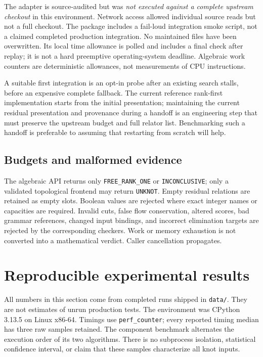 \documentclass[11pt,letterpaper]{article}
\theoremstyle{definition}\newtheorem{definition}[theorem]{Definition}
\begin{document}
The adapter is source-audited but was \emph{not executed against a complete upstream checkout} in this environment. Network access allowed individual source reads but not a full checkout. The package includes a fail-loud integration smoke script, not a claimed completed production integration. No maintained files have been overwritten. Its local time allowance is polled and includes a final check after replay; it is not a hard preemptive operating-system deadline. Algebraic work counters are deterministic allowances, not measurements of CPU instructions.

A suitable first integration is an opt-in probe after an existing search stalls, before an expensive complete fallback. The current reference rank-first implementation starts from the initial presentation; maintaining the current residual presentation and provenance during a handoff is an engineering step that must preserve the upstream budget and full relator list. Benchmarking such a handoff is preferable to assuming that restarting from scratch will help.

\subsection{Budgets and malformed evidence}
The algebraic API returns only \texttt{FREE\_RANK\_ONE} or \texttt{INCONCLUSIVE}; only a validated topological frontend may return \texttt{UNKNOT}. Empty residual relations are retained as empty slots. Boolean values are rejected where exact integer names or capacities are required. Invalid cuts, false flow conservation, altered scores, bad grammar references, changed input bindings, and incorrect elimination targets are rejected by the corresponding checkers. Work or memory exhaustion is not converted into a mathematical verdict. Caller cancellation propagates.

\section{Reproducible experimental results}\label{sec:experiments}
All numbers in this section come from completed runs shipped in \texttt{data/}. They are not estimates of unrun production tests. The environment was CPython 3.13.5 on Linux x86-64. Timings use \texttt{perf\_counter}; every reported timing median has three raw samples retained. The component benchmark alternates the execution order of its two algorithms. There is no subprocess isolation, statistical confidence interval, or claim that these samples characterize all knot inputs.
\end{document}
